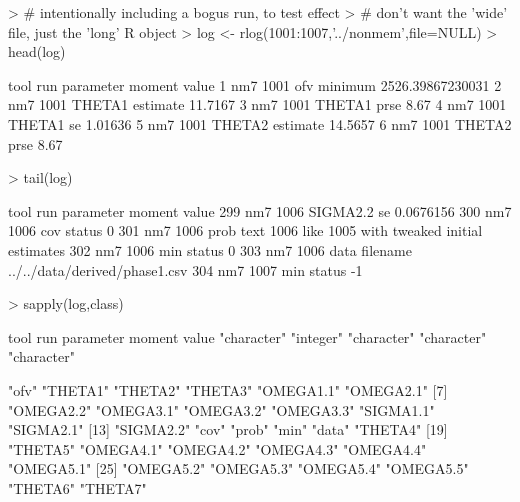 \begin{Schunk}
\begin{Sinput}
> # intentionally including a bogus run, to test effect
> # don't want the 'wide' file, just the 'long' R object
> log <- rlog(1001:1007,'../nonmem',file=NULL) 
> head(log)
\end{Sinput}
\begin{Soutput}
  tool  run parameter   moment            value
1  nm7 1001       ofv  minimum 2526.39867230031
2  nm7 1001    THETA1 estimate          11.7167
3  nm7 1001    THETA1     prse             8.67
4  nm7 1001    THETA1       se          1.01636
5  nm7 1001    THETA2 estimate          14.5657
6  nm7 1001    THETA2     prse             8.67
\end{Soutput}
\begin{Sinput}
> tail(log)
\end{Sinput}
\begin{Soutput}
    tool  run parameter   moment                                         value
299  nm7 1006  SIGMA2.2       se                                     0.0676156
300  nm7 1006       cov   status                                             0
301  nm7 1006      prob     text 1006 like 1005 with tweaked initial estimates
302  nm7 1006       min   status                                             0
303  nm7 1006      data filename                 ../../data/derived/phase1.csv
304  nm7 1007       min   status                                            -1
\end{Soutput}
\begin{Sinput}
> sapply(log,class)
\end{Sinput}
\begin{Soutput}
       tool         run   parameter      moment       value 
"character"   "integer" "character" "character" "character" 
\end{Soutput}
\begin{Soutput}
 [1] "ofv"      "THETA1"   "THETA2"   "THETA3"   "OMEGA1.1" "OMEGA2.1"
 [7] "OMEGA2.2" "OMEGA3.1" "OMEGA3.2" "OMEGA3.3" "SIGMA1.1" "SIGMA2.1"
[13] "SIGMA2.2" "cov"      "prob"     "min"      "data"     "THETA4"  
[19] "THETA5"   "OMEGA4.1" "OMEGA4.2" "OMEGA4.3" "OMEGA4.4" "OMEGA5.1"
[25] "OMEGA5.2" "OMEGA5.3" "OMEGA5.4" "OMEGA5.5" "THETA6"   "THETA7"  
\end{Soutput}
\begin{Sinput}

\end{Sinput}
\end{Schunk}

